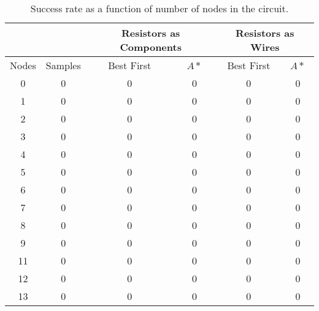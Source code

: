 \begin{table}[H]
\begin{center}
\begin{singlespace}
\begin{tabular}{| c | c || c | c | c | c |}
\hline
 & & \multicolumn{2}{|c|}{Resistors as Components} & \multicolumn{2}{|c|}{
 Resistors as Wires} \\
\hline
Nodes & Samples & Best First & $A*$ & Best First & $A*$ \\
\hline\hline
0 & 0 & 0 & 0 & 0 & 0 \\
1 & 0 & 0 & 0 & 0 & 0 \\
2 & 0 & 0 & 0 & 0 & 0 \\
3 & 0 & 0 & 0 & 0 & 0 \\
4 & 0 & 0 & 0 & 0 & 0 \\
5 & 0 & 0 & 0 & 0 & 0 \\
6 & 0 & 0 & 0 & 0 & 0 \\
7 & 0 & 0 & 0 & 0 & 0 \\
8 & 0 & 0 & 0 & 0 & 0 \\
9 & 0 & 0 & 0 & 0 & 0 \\
11 & 0 & 0 & 0 & 0 & 0 \\
12 & 0 & 0 & 0 & 0 & 0 \\
13 & 0 & 0 & 0 & 0 & 0 \\
\hline
\end{tabular}
\end{singlespace}
\end{center}
\caption{Success rate as a function of number of nodes in the circuit.}
\end{table}

